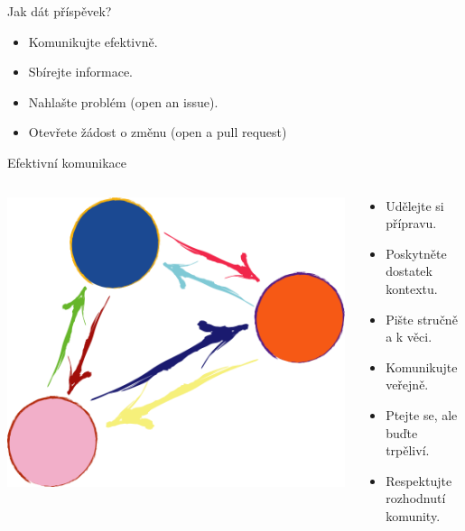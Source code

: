 \documentclass[11pt]{beamer}
\begin{document}
\begin{frame}{Jak dát příspěvek?}
	\begin{itemize}
		\item Komunikujte efektivně.
		\item Sbírejte informace.
		\item Nahlašte problém (open an issue).
		\item Otevřete žádost o změnu (open a pull request)
	\end{itemize}
\end{frame}


\begin{frame}{Efektivní komunikace}
		\begin{columns}[T]
			\begin{column}{0.5\textwidth}
			\includegraphics[width=\textwidth]{images/communicate.png}
			\end{column}
			
		\begin{column}{0.5\textwidth}
				\begin{itemize}
				\item Udělejte si přípravu.
				\item Poskytněte dostatek kontextu.
				\item Pište stručně a k věci.
				\item Komunikujte veřejně.
				\item Ptejte se, ale buďte trpěliví.
				\item Respektujte rozhodnutí komunity.
			\end{itemize}
			
		\end{column}
	\end{columns}
\end{frame}
\end{document}
